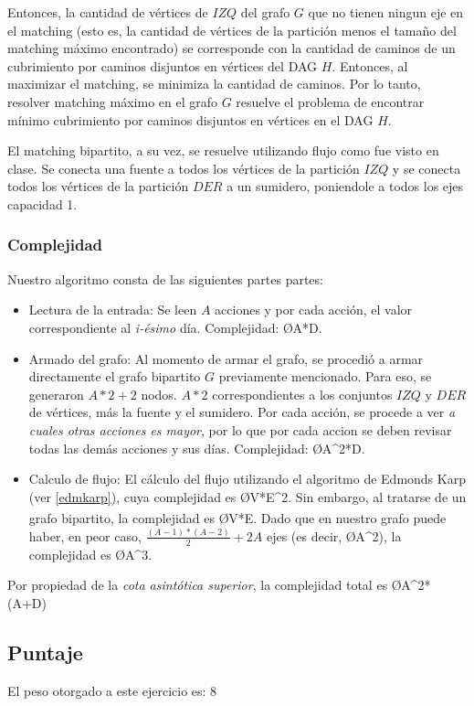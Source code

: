 Entonces, la cantidad de vértices de $IZQ$ del grafo $G$ que no tienen ningun eje en el matching (esto es, la cantidad de vértices de la partición menos el tamaño del matching máximo encontrado) se corresponde con la cantidad de caminos de un cubrimiento por caminos disjuntos en vértices del DAG $H$. Entonces, al maximizar el matching, se minimiza la cantidad de caminos. Por lo tanto, resolver matching máximo en el grafo $G$ resuelve el problema de encontrar mínimo cubrimiento por caminos disjuntos en vértices en el DAG $H$.

El matching bipartito, a su vez, se resuelve utilizando flujo como fue visto en clase. Se conecta una fuente a todos los vértices de la partición $IZQ$ y se conecta todos los vértices de la partición $DER$ a un sumidero, poniendole a todos los ejes capacidad 1.

\subsubsection{Complejidad}
Nuestro algoritmo consta de las siguientes partes partes:
\begin{itemize}
	\item Lectura de la entrada: Se leen $A$ acciones y por cada acción, el valor correspondiente al \emph{i-ésimo} día. Complejidad: \O{A*D}.
	\item Armado del grafo: Al momento de armar el grafo, se procedió a armar directamente el grafo bipartito $G$ previamente mencionado. Para eso, se generaron $A*2+2$ nodos. $A*2$ correspondientes a los conjuntos $IZQ$ y $DER$ de vértices, más la fuente y el sumidero. Por cada acción, se procede a ver \emph{a cuales otras acciones es mayor}, por lo que por cada accion se deben revisar todas las demás acciones y sus días. Complejidad: \O{A^2*D}.
	\item Calculo de flujo: El cálculo del flujo utilizando el algoritmo de Edmonds Karp (ver \ref{edmkarp}), cuya complejidad es \O{V*E^2}. Sin embargo, al tratarse de un grafo bipartito, la complejidad es \O{V*E}\textsuperscript{\cite{cormen}}. Dado que en nuestro grafo puede haber, en peor caso, $\frac{(A-1)*(A-2)}{2}+2A$ ejes (es decir, \O{A^2}), la complejidad es \O{A^3}.
\end{itemize}

Por propiedad de la \emph{cota asintótica superior}, la complejidad total es
\O{A^2*(A+D)}

\subsection{Puntaje}
El peso otorgado a este ejercicio es: 8